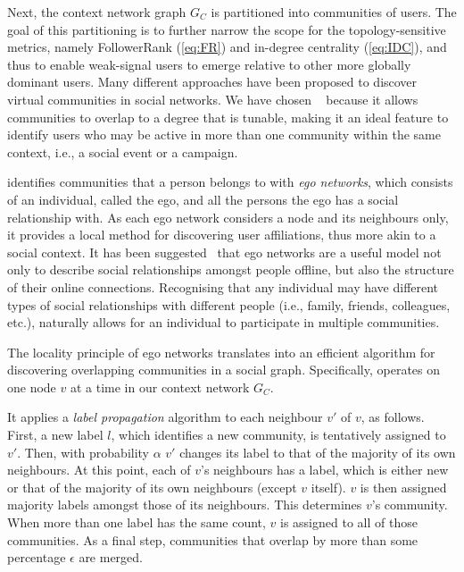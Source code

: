 \documentclass[runningheads]{llncs}
\begin{document}
Next, the context network graph $G_C$  is partitioned into communities of users.
The goal of this partitioning is to further narrow the scope for the topology-sensitive metrics, namely FollowerRank (\ref{eq:FR}) and in-degree centrality (\ref{eq:IDC}), 
and thus to enable weak-signal users to emerge relative to other more globally dominant users.
%
Many different approaches have been proposed to discover virtual communities in social networks. 
We have chosen \demon~\cite{Coscia:2012:DLD:2339530.2339630} because it allows communities to overlap to a degree that is tunable, making it an ideal feature to identify users who may be active in more than one community within the same context, i.e., a social event or a campaign.

\demon identifies communities that a person belongs to with \textit{ego networks}, which consists of an individual, called the ego, and all the persons the ego has a social relationship with. 
As each ego network considers a node and its neighbours only, it provides a local method for discovering user affiliations, thus more akin to a social context.
%
It has been suggested~\cite{Arnaboldi2013} that ego networks are a useful model not only to describe social relationships amongst people offline, but also the structure of their online connections. 
Recognising that any individual may have different types of social relationships with different people (i.e., family, friends, colleagues, etc.),  \demon  naturally allows for an individual to participate in multiple communities. 

The locality principle of ego networks translates into an efficient algorithm for discovering overlapping communities in a social graph. 
Specifically, \demon operates on one node $v$ at a time in our context network $G_C$.

It applies a \textit{label propagation} algorithm to each neighbour $v'$ of $v$, as follows. First, a new label $l$, which identifies a new community, is tentatively assigned to $v'$. 
	Then, with probability $\alpha$ $v'$ changes its label to that of the majority of its own neighbours. 
	At this point, each of $v$'s neighbours has a label, which is either new or that of the majority of its own neighbours (except $v$ itself).
	$v$ is then assigned majority labels amongst those of its neighbours. 
	This determines $v$'s community. 
	When more than one label has the same count, $v$ is assigned to all of those communities.
%
As a final step, communities that overlap by more than some percentage $\epsilon $ are merged.
\end{document}
